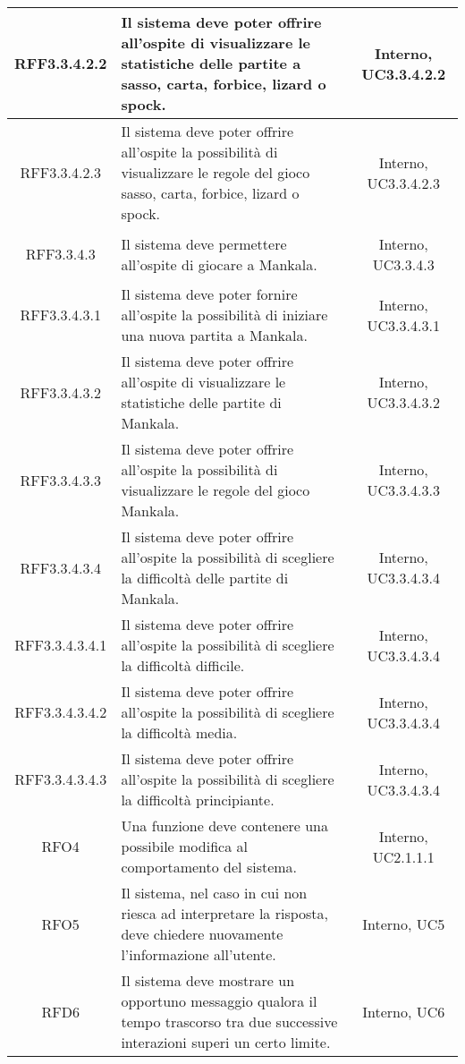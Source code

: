 \begin{longtable}{|c|>{\centering}m{7cm}|c|}
\hypertarget{RFF3.3.4.2.2}{RFF3.3.4.2.2} & Il sistema deve poter offrire all'ospite di visualizzare le statistiche delle partite a sasso, carta, forbice, lizard o spock. & Interno, UC3.3.4.2.2\\ \hline
\hypertarget{RFF3.3.4.2.3}{RFF3.3.4.2.3} & Il sistema deve poter offrire all'ospite la possibilità di visualizzare le regole del gioco sasso, carta, forbice, lizard o spock. & Interno, UC3.3.4.2.3\\ \hline
\hypertarget{RFF3.3.4.3}{RFF3.3.4.3} & Il sistema deve permettere all'ospite di giocare a Mankala. & Interno, UC3.3.4.3\\ \hline
\hypertarget{RFF3.3.4.3.1}{RFF3.3.4.3.1} & Il sistema deve poter fornire all'ospite la possibilità di iniziare una nuova partita a Mankala. & Interno, UC3.3.4.3.1\\ \hline
\hypertarget{RFF3.3.4.3.2}{RFF3.3.4.3.2} & Il sistema deve poter offrire all'ospite di visualizzare le statistiche delle partite di Mankala. & Interno, UC3.3.4.3.2\\ \hline
\hypertarget{RFF3.3.4.3.3}{RFF3.3.4.3.3} & Il sistema deve poter offrire all'ospite la possibilità di visualizzare le regole del gioco Mankala. & Interno, UC3.3.4.3.3\\ \hline
\hypertarget{RFF3.3.4.3.4}{RFF3.3.4.3.4} & Il sistema deve poter offrire all'ospite la possibilità di scegliere la difficoltà delle partite di Mankala. & Interno, UC3.3.4.3.4\\ \hline
\hypertarget{RFF3.3.4.3.4.1}{RFF3.3.4.3.4.1} & Il sistema deve poter offrire all'ospite la possibilità di scegliere la difficoltà difficile. & Interno, UC3.3.4.3.4\\ \hline
\hypertarget{RFF3.3.4.3.4.2}{RFF3.3.4.3.4.2} & Il sistema deve poter offrire all'ospite la possibilità di scegliere la difficoltà media. & Interno, UC3.3.4.3.4\\ \hline
\hypertarget{RFF3.3.4.3.4.3}{RFF3.3.4.3.4.3} & Il sistema deve poter offrire all'ospite la possibilità di scegliere la difficoltà principiante. & Interno, UC3.3.4.3.4\\ \hline
\hypertarget{RFO4}{RFO4} & Una funzione deve contenere una possibile modifica al comportamento del sistema. & Interno, UC2.1.1.1\\ \hline
\hypertarget{RFO5}{RFO5} & Il sistema, nel caso in cui non riesca ad interpretare la risposta, deve chiedere nuovamente l'informazione all'utente. & Interno, UC5\\ \hline
\hypertarget{RFD6}{RFD6} & Il sistema deve mostrare un opportuno messaggio qualora il tempo trascorso tra due successive interazioni superi un certo limite. & Interno, UC6\\ \hline

\end{longtable}
